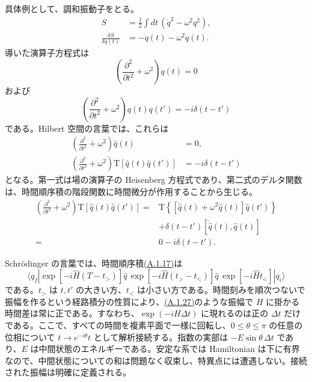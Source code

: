 具体例として、調和振動子をとる。
\begin{align}
S&=\frac12\int dt\,(\dot q^2-\omega^2q^2),
\tag{A.1.22a}\label{eq:A.1.22a}\\
\frac{\delta S}{\delta q(t)}&=-\ddot q(t)-\omega^2q(t).
\tag{A.1.22b}\label{eq:A.1.22b}
\end{align}
導いた演算子方程式は
\begin{equation}
\left(\frac{\partial^2}{\partial t^2}+\omega^2\right)q(t)=0
\tag{A.1.23}\label{eq:A.1.23}
\end{equation}
および
\begin{equation}
\left(\frac{\partial^2}{\partial t^2}+\omega^2\right)
q(t)q(t')=-i\delta(t-t')
\tag{A.1.24}\label{eq:A.1.24}
\end{equation}
である。Hilbert 空間の言葉では、これらは
\begin{equation}
\begin{aligned}
\left(\frac{\partial^2}{\partial t^2}+\omega^2\right)\hat q(t)&=0,\\
\left(\frac{\partial^2}{\partial t^2}+\omega^2\right)
\mathrm T[\hat q(t)\hat q(t')]&=-i\delta(t-t')
\end{aligned}
\tag{A.1.25a}\label{eq:A.1.25a}
\end{equation}
となる。第一式は場の演算子の Heisenberg 方程式であり、第二式のデルタ関数は、時間順序積の階段関数に時間微分が作用することから生じる。
\begin{equation}
\begin{aligned}
\left(\frac{\partial^2}{\partial t^2}+\omega^2\right)
\mathrm T[\hat q(t)\hat q(t')]
={}&\mathrm T\left\{[\ddot{\hat q}(t)+\omega^2\hat q(t)]\hat q(t')\right\}\\
&+\delta(t-t')[\dot{\hat q}(t),\hat q(t)]\\
={}&0-i\delta(t-t').
\end{aligned}
\tag{A.1.26}\label{eq:A.1.26}
\end{equation}


Schrödinger の言葉では、時間順序積\hyperref[eq:A.1.17]{(A.1.17)}は
\begin{equation}
\langle q_f|
\exp[-i\hat H(T-t_>)]\hat q\,
\exp[-i\hat H(t_>-t_<)]\hat q\,
\exp[-i\hat Ht_<]|q_i\rangle
\tag{A.1.27}\label{eq:A.1.27}
\end{equation}
である。$t_>$ は $t,t'$ の大きい方、$t_<$ は小さい方である。時間刻みを順次つないで振幅を作るという経路積分の性質により、\hyperref[eq:A.1.27]{(A.1.27)}のような振幅で $H$ に掛かる時間差は常に正である。すなわち、$\exp(-iH\Delta t)$ に現れるのは正の $\Delta t$ だけである。ここで、すべての時間を複素平面で一様に回転し、$0\leq\theta\leq\pi$ の任意の位相について $t\to e^{-i\theta}t$ として解析接続する。指数の実部は $-E\sin\theta\,\Delta t$ であり、$E$ は中間状態のエネルギーである。安定な系では Hamiltonian は下に有界なので、中間状態についての和は問題なく収束し、特異点には遭遇しない。接続された振幅は明確に定義される。

